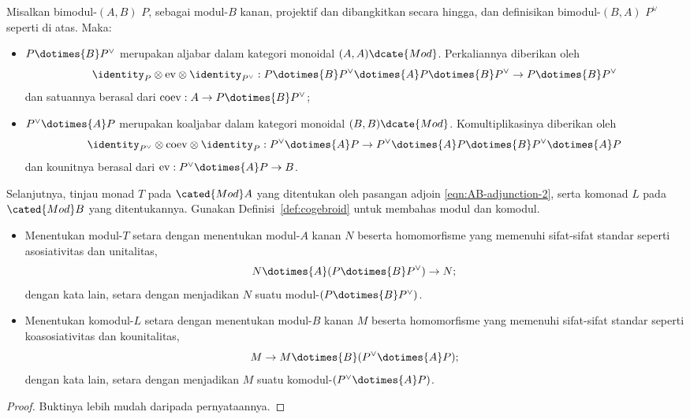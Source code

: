 \begin{proposition}\label{prop:Morita-comonad}
	Misalkan bimodul-$(A,B)$ $P$, sebagai modul-$B$ kanan, projektif dan
	dibangkitkan secara hingga, dan definisikan bimodul-$(B,A)$ $P^\vee$ seperti
	di atas. Maka:
	\begin{itemize}
		\item $P\dotimes{B}P^\vee$ merupakan aljabar dalam kategori monoidal
		$(A,A)\dcate{Mod}$. Perkaliannya diberikan oleh
		\[ \identity_P \otimes \mathrm{ev} \otimes \identity_{P^\vee}: P \dotimes{B} P^\vee \dotimes{A} P \dotimes{B} P^\vee \to P \dotimes{B} P^\vee \]
		dan satuannya berasal dari
		$\mathrm{coev}:A\to P\dotimes{B}P^\vee$;
		\item $P^\vee\dotimes{A}P$ merupakan koaljabar dalam kategori monoidal
		$(B,B)\dcate{Mod}$. Komultiplikasinya diberikan oleh
		\[ \identity_{P^\vee} \otimes \mathrm{coev} \otimes \identity_P: P^\vee \dotimes{A} P \to P^\vee \dotimes{A} P \dotimes{B} P^\vee \dotimes{A} P \]
		dan kounitnya berasal dari
		$\mathrm{ev}:P^\vee\dotimes{A}P\to B$.
	\end{itemize}

	Selanjutnya, tinjau monad $T$ pada $\cated{Mod}A$ yang ditentukan oleh
	pasangan adjoin \eqref{eqn:AB-adjunction-2}, serta komonad $L$ pada
	$\cated{Mod}B$ yang ditentukannya. Gunakan Definisi~\ref{def:cogebroid}
	untuk membahas modul dan komodul.
	\begin{itemize}
		\item Menentukan modul-$T$ setara dengan menentukan
		modul-$A$ kanan $N$ beserta homomorfisme yang memenuhi sifat-sifat
		standar seperti asosiativitas dan unitalitas,
		\[ N \dotimes{A} (P \dotimes{B} P^\vee) \to N; \]
		dengan kata lain, setara dengan menjadikan $N$ suatu
		modul-$(P\dotimes{B}P^\vee)$.
		\item Menentukan komodul-$L$ setara dengan menentukan
		modul-$B$ kanan $M$ beserta homomorfisme yang memenuhi sifat-sifat
		standar seperti koasosiativitas dan kounitalitas,
		\[ M \to M \dotimes{B} (P^\vee \dotimes{A} P); \]
		dengan kata lain, setara dengan menjadikan $M$ suatu
		komodul-$(P^\vee\dotimes{A}P)$.
	\end{itemize}
\end{proposition}
\begin{proof}
	Buktinya lebih mudah daripada pernyataannya.
\end{proof}

